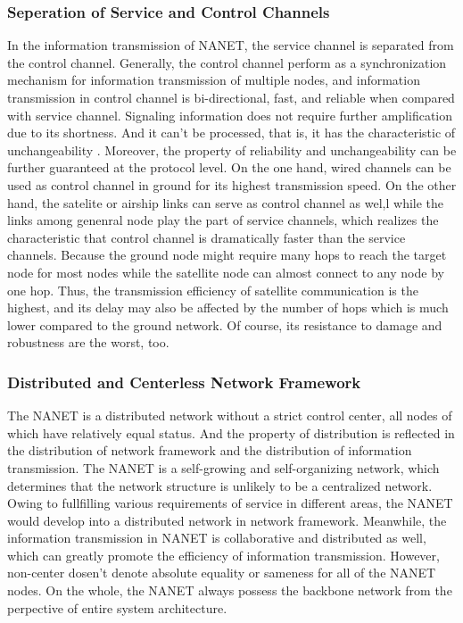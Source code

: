\documentclass[journal,comsoc]{IEEEtran}
\begin{document}
			\subsubsection{Seperation of Service and Control Channels}
				In the information transmission of NANET, the service channel is separated from the control channel.
				Generally, the control channel perform as a synchronization mechanism for information transmission of multiple nodes, 
				and information transmission in control channel is bi-directional, fast, and reliable when compared with service channel.                  
				Signaling information does not require further amplification due to its shortness.
				And it can't be processed, that is, it has the characteristic of unchangeability .
				Moreover, the property of reliability and unchangeability can be further guaranteed at the protocol level.
				On the one hand, wired channels can be used as control channel in ground for its highest transmission speed.
				On the other hand, the satelite or airship links can serve as control channel as wel,l while the links among genenral node play the part of service channels, 
				which realizes the characteristic that control channel is dramatically faster than the service channels.
				Because the ground node might require many hops to reach the target node for most nodes while the satellite node can almost connect to any node by one hop.
				Thus, the transmission efficiency of satellite communication is the highest, and its delay may also be affected by the number of hops which is much lower compared to the ground network.
				Of course, its resistance to damage and robustness are the worst, too.

			\subsubsection{Distributed and Centerless Network Framework}
				The NANET is a distributed network without a strict control center, all nodes of which have relatively equal status.
				And the property of distribution is reflected in the distribution of network framework and the distribution of information transmission.
				The NANET is a self-growing and self-organizing network, which determines that the network structure is unlikely to be a centralized network.
				Owing to fullfilling various requirements of service in different areas, the NANET would develop into a distributed network in network framework.
				Meanwhile, the information transmission in NANET is collaborative and distributed as well, which can greatly promote the efficiency of information transmission.
				However, non-center dosen't denote absolute equality or sameness for all of the NANET nodes.
				On the whole, the NANET always possess the backbone network from the perpective of entire system architecture.
				
\end{document}
